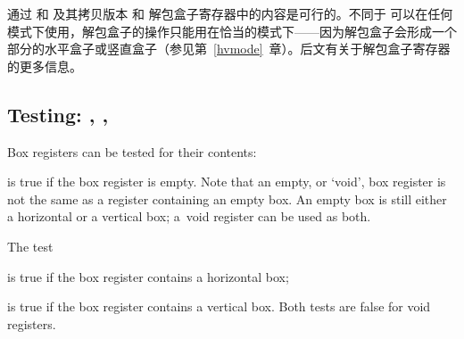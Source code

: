 \documentclass{book}
\begin{document}
通过  和  及其拷贝版本  和  解包盒子寄存器中的内容是可行的。不同于  可以在任何模式下使用，解包盒子的操作只能用在恰当的模式下——因为解包盒子会形成一个部分的水平盒子或竖直盒子（参见第~\ref{hvmode}~章）。后文有关于解包盒子寄存器的更多信息。

\subsection{Testing: , , }

Box
registers can be tested for their contents:
\begin{disp}\end{disp}
is true if the box register is empty.
Note that an empty, or `void',
box register is not the same as a register containing an empty box.
An empty box is still either a horizontal or a vertical box;
a~void register can be used as both.

The test
\begin{disp}\end{disp}
is true if the box register contains a horizontal box;
\begin{disp}\end{disp}
is true if the box register contains a vertical box.
Both tests are false for void registers.
\end{document}

